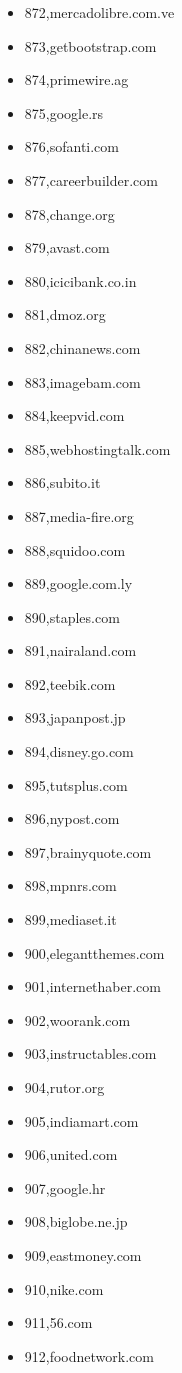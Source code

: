 \begin{multicols}{3}
\begin{itemize}
	\item 872,mercadolibre.com.ve
	\item 873,getbootstrap.com
	\item 874,primewire.ag
	\item 875,google.rs
	\item 876,sofanti.com
	\item 877,careerbuilder.com
	\item 878,change.org
	\item 879,avast.com
	\item 880,icicibank.co.in
	\item 881,dmoz.org
	\item 882,chinanews.com
	\item 883,imagebam.com
	\item 884,keepvid.com
	\item 885,webhostingtalk.com
	\item 886,subito.it
	\item 887,media-fire.org
	\item 888,squidoo.com
	\item 889,google.com.ly
	\item 890,staples.com
	\item 891,nairaland.com
	\item 892,teebik.com
	\item 893,japanpost.jp
	\item 894,disney.go.com
	\item 895,tutsplus.com
	\item 896,nypost.com
	\item 897,brainyquote.com
	\item 898,mpnrs.com
	\item 899,mediaset.it
	\item 900,elegantthemes.com
	\item 901,internethaber.com
	\item 902,woorank.com
	\item 903,instructables.com
	\item 904,rutor.org
	\item 905,indiamart.com
	\item 906,united.com
	\item 907,google.hr
	\item 908,biglobe.ne.jp
	\item 909,eastmoney.com
	\item 910,nike.com
	\item 911,56.com
	\item 912,foodnetwork.com

\end{itemize}
\end{multicols}
